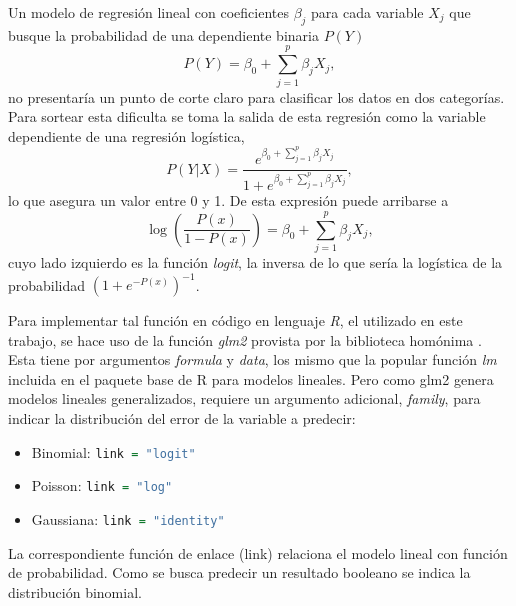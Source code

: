 \documentclass[a4paper]{report}
\begin{document}
Un modelo de regresión lineal con coeficientes \(\beta_j\) para cada variable \(X_j\) que busque la probabilidad de una dependiente binaria \(P(Y)\)  
\begin{equation}
P(Y) = \beta_0 + \sum\limits_{j=1}^p \beta_j X_j,	
\end{equation}
no presentaría un punto de corte claro para clasificar los datos en dos categorías.
Para sortear esta dificulta se toma la salida de esta regresión como la variable dependiente de una regresión logística,
\begin{equation}
P(Y|X)= \frac{e^{\beta_0 + \sum\limits_{j=1}^p \beta_j X_j}}{1+e^{\beta_0 + \sum\limits_{j=1}^p \beta_j X_j}},
\end{equation}
lo que asegura un valor entre 0 y 1.
De esta expresión puede arribarse a 
\begin{equation}
	\log \left( \frac{P(x)}{1-P(x)} \right) = \beta_0 + \sum\limits_{j=1}^p \beta_j X_j,
\end{equation}
cuyo lado izquierdo es la función \emph{logit}, la inversa de lo que sería la logística de la probabilidad \(\left(1 + e^{-{P(x)}}\right)^{-1}\).

Para implementar tal función en código en lenguaje \emph{R}, el utilizado en este trabajo, se hace uso de la función \emph{glm2} provista por la biblioteca homónima \cite{marschner_glm2_2011}.
Esta tiene por argumentos \emph{formula} y \emph{data}, los mismo que la popular función \emph{lm} incluida en el paquete base de R para modelos lineales.
Pero como glm2 genera modelos lineales generalizados, requiere un argumento adicional, \emph{family}, para indicar la distribución del error de la variable a predecir:
\begin{itemize}
	\item Binomial: \lstinline[language=R]{link = "logit"}
	\item Poisson: \lstinline[language=R]{link = "log"}
	\item Gaussiana: \lstinline[language=R]{link = "identity"}
\end{itemize}
La correspondiente función de enlace (link) relaciona el modelo lineal con función de probabilidad.
Como se busca predecir un resultado booleano se indica la distribución binomial.

\end{document}
